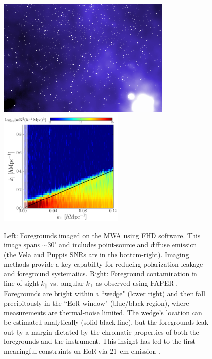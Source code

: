 \documentclass[preprint]{aastex}
\def\kperp{k_{\bot}}
\def\kpar{k_{\|}}
\def\kperp{k_{\bot}}
\def\kpar{k_{\|}}
\begin{document}
\begin{figure}[!ht] \centering
\includegraphics[height=2.3in]{plots/MWApretty_crop.png} %
\includegraphics[height=2.3in]{plots/wedge_tall_wide.png} \caption{\small Left:
Foregrounds imaged on the MWA using FHD software.
This image spans $\sim$$30^{\circ}$ and
includes point-source and diffuse emission (the Vela and Puppis SNRs are in the
bottom-right). Imaging methods provide a key capability for reducing
polarization leakage and foreground systematics.  
Right: Foreground contamination in line-of-sight $\kpar$ vs.\ angular $\kperp$
as observed using PAPER \citep{pober_et_al2013}.
Foregrounds are bright within a ``wedge" (lower right) and then fall 
precipitously in the ``EoR window" (blue/black 
region), where measurements are thermal-noise limited.  The wedge's location can 
be estimated analytically (solid black line), but the foregrounds leak out by a margin 
dictated by the chromatic properties of both the foregrounds and the instrument.
This insight has led to the
first meaningful constraints on EoR via 21~cm emission
\citep{parsons_et_al2013}.
}\label{fig:twoFGViews} \end{figure}
\end{document}
